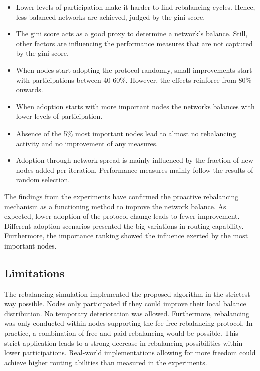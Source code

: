 \documentclass[final]{fhnwreport}       %
\begin{document}
\begin{itemize}
  \item Lower levels of participation make it harder to find rebalancing cycles. Hence, less balanced networks are achieved, judged by the \gls{gini} score.
  \item The \gls{gini} score acts as a good \gls{proxy} to determine a network's balance. Still, other factors are influencing the performance measures that are not captured by the \gls{gini} score.
  \item When nodes start adopting the protocol randomly, small improvements start with participations between 40-60\%. However, the effects reinforce from 80\% onwards.
  \item When adoption starts with more important nodes the networks balances with lower levels of participation.
  \item Absence of the 5\% most important nodes lead to almost no rebalancing activity and no improvement of any measures. 
  \item Adoption through network spread is mainly influenced by the fraction of new nodes added per iteration. Performance measures mainly follow the results of random selection.
\end{itemize}

The findings from the experiments have confirmed the proactive rebalancing mechanism as a functioning method to improve the network balance. As expected, lower adoption of the protocol change leads to fewer improvement. Different adoption scenarios presented the big variations in routing capability. Furthermore, the importance ranking showed the influence exerted by the most important nodes.

\subsection{Limitations}
The rebalancing simulation implemented the proposed algorithm in the strictest way possible. Nodes only participated if they could improve their local balance distribution. No temporary deterioration was allowed. Furthermore, rebalancing was only conducted within nodes supporting the fee-free rebalancing protocol. In practice, a combination of free and paid rebalancing would be possible. This strict application leads to a strong decrease in rebalancing possibilities within lower participations. Real-world implementations allowing for more freedom could achieve higher routing abilities than measured in the experiments.
\end{document}
